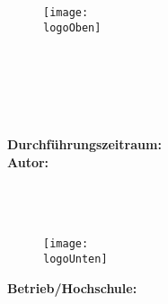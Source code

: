 \begin{titlepage}
    
\begin{figure}[t]
    \centering
    \texttt{[image: \\logoOben]}
    \label{fig:ihk1}	
\end{figure}
    
\begin{center}
    {\large \pruefungstermin} \\[2em]
    	
    {\Large \rahmen} \\[1em]
    {\Large \betreff} \\[5em]
    	
    \textbf{\huge \titel} \\[1em]
    \textbf{\Large \untertitel} \\[4em]
    	
    \textbf{Durchführungszeitraum:} \zeitraum\\[2em]
    	
    \textbf{Autor:}\\
    \autorName\\
    \autorAnschrift\\
    \autorOrt\\
\end{center}
    
\begin{figure}[h]
    \centering
    \texttt{[image: \\logoUnten]}
    \label{fig:vbmh1}
\end{figure}
    
\begin{center}
    \textbf{Betrieb/Hochschule:}\\
    \betriebName\\
    \betriebAnschrift\\
    \betriebOrt\\
\end{center}
    
\end{titlepage}